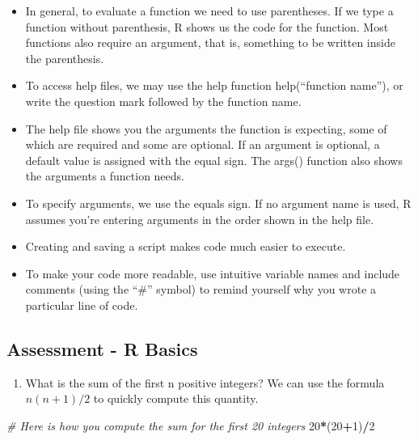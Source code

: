 \documentclass[
]{article}
\newenvironment{Shaded}{\begin{snugshade}}{\end{snugshade}}
\newcommand{\CommentTok}[1]{\textcolor[rgb]{0.56,0.35,0.01}{\textit{#1}}}
\newcommand{\DecValTok}[1]{\textcolor[rgb]{0.00,0.00,0.81}{#1}}
\newcommand{\NormalTok}[1]{#1}
\newcommand{\OperatorTok}[1]{\textcolor[rgb]{0.81,0.36,0.00}{\textbf{#1}}}
\providecommand{\tightlist}{%
  \setlength{\itemsep}{0pt}\setlength{\parskip}{0pt}}
\begin{document}
\begin{itemize}
\tightlist
\item
  In general, to evaluate a function we need to use parentheses. If we
  type a function without parenthesis, R shows us the code for the
  function. Most functions also require an argument, that is, something
  to be written inside the parenthesis.
\item
  To access help files, we may use the help function help(``function
  name''), or write the question mark followed by the function name.
\item
  The help file shows you the arguments the function is expecting, some
  of which are required and some are optional. If an argument is
  optional, a default value is assigned with the equal sign. The args()
  function also shows the arguments a function needs.
\item
  To specify arguments, we use the equals sign. If no argument name is
  used, R assumes you're entering arguments in the order shown in the
  help file.
\item
  Creating and saving a script makes code much easier to execute.
\item
  To make your code more readable, use intuitive variable names and
  include comments (using the ``\#'' symbol) to remind yourself why you
  wrote a particular line of code.
\end{itemize}

\hypertarget{assessment---r-basics}{%
\subsection{Assessment - R Basics}\label{assessment---r-basics}}

\begin{enumerate}
\def\labelenumi{\arabic{enumi}.}
\tightlist
\item
  What is the sum of the first n positive integers? We can use the
  formula \(n(n+1)/2\) to quickly compute this quantity.
\end{enumerate}

\begin{Shaded}
\begin{Highlighting}[]
\CommentTok{# Here is how you compute the sum for the first 20 integers}
\DecValTok{20}\OperatorTok{*}\NormalTok{(}\DecValTok{20}\OperatorTok{+}\DecValTok{1}\NormalTok{)}\OperatorTok{/}\DecValTok{2} 
\end{Highlighting}
\end{Shaded}
\end{document}
